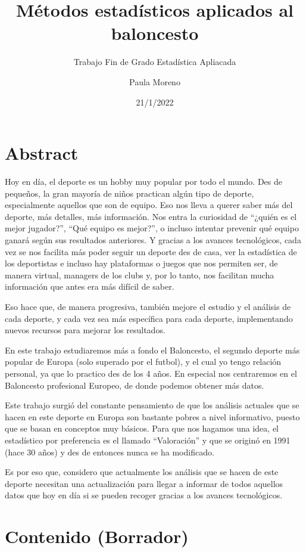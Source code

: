 \documentclass[
]{article}
\title{Métodos estadísticos aplicados al baloncesto}
\subtitle{Trabajo Fin de Grado Estadística Apliacada}
\author{Paula Moreno}
\date{21/1/2022}
\begin{document}
\maketitle

\hypertarget{abstract}{%
\section{Abstract}\label{abstract}}

Hoy en día, el deporte es un hobby muy popular por todo el mundo. Des de
pequeños, la gran mayoría de niños practican algún tipo de deporte,
especialmente aquellos que son de equipo. Eso nos lleva a querer saber
más del deporte, más detalles, más información. Nos entra la curiosidad
de ``¿quién es el mejor jugador?'', ``Qué equipo es mejor?'', o incluso
intentar prevenir qué equipo ganará según sus resultados anteriores. Y
gracias a los avances tecnológicos, cada vez se nos facilita más poder
seguir un deporte des de casa, ver la estadística de los deportistas e
incluso hay plataformas o juegos que nos permiten ser, de manera
virtual, managers de los clubs y, por lo tanto, nos facilitan mucha
información que antes era más difícil de saber.

Eso hace que, de manera progresiva, también mejore el estudio y el
análisis de cada deporte, y cada vez sea más específica para cada
deporte, implementando nuevos recursos para mejorar los resultados.

En este trabajo estudiaremos más a fondo el Baloncesto, el segundo
deporte más popular de Europa (solo superado por el futbol), y el cual
yo tengo relación personal, ya que lo practico des de los 4 años. En
especial nos centraremos en el Baloncesto profesional Europeo, de donde
podemos obtener más datos.

Este trabajo surgió del constante pensamiento de que los análisis
actuales que se hacen en este deporte en Europa son bastante pobres a
nivel informativo, puesto que se basan en conceptos muy básicos. Para
que nos hagamos una idea, el estadístico por preferencia es el llamado
``Valoración'' y que se originó en 1991 (hace 30 años) y des de entonces
nunca se ha modificado.

Es por eso que, considero que actualmente los análisis que se hacen de
este deporte necesitan una actualización para llegar a informar de todos
aquellos datos que hoy en día si se pueden recoger gracias a los avances
tecnológicos.

\hypertarget{contenido-borrador}{%
\section{Contenido (Borrador)}\label{contenido-borrador}}
\end{document}

